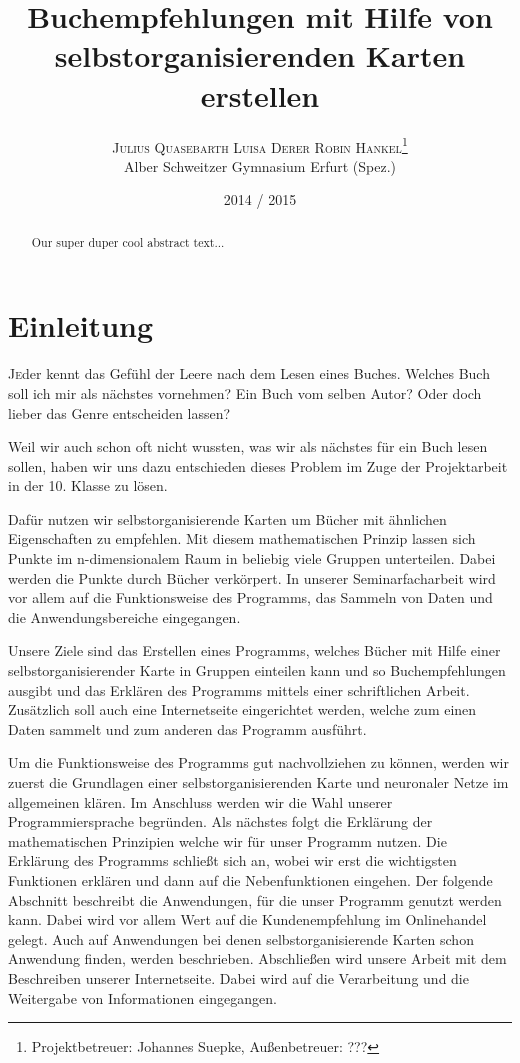 \documentclass[twoside,a4paper]{article}
\title{\vspace{-15mm}\fontsize{24pt}{10pt}\selectfont\bfseries{}Buchempfehlungen mit Hilfe von selbstorganisierenden Karten erstellen}
\author{\large\textsc{Julius Quasebarth \quad Luisa Derer \quad Robin Hankel}\thanks{Projektbetreuer: Johannes Suepke, Außenbetreuer: ???}\\[2mm]\normalsize Alber Schweitzer Gymnasium Erfurt (Spez.)\\\vspace{-5mm}}
\date{2014 / 2015}
\newcommand{\commonlettrine}[1]{\lettrine[nindent=0em,lines=2]{#1}}
\begin{document}
\maketitle

\thispagestyle{fancy}


\begin{otherlanguage}{english}
\begin{abstract}
\noindent
Our super duper cool abstract text...
\end{abstract}
\end{otherlanguage}

\tableofcontents

\section{Einleitung}

\commonlettrine{J}eder kennt das Gefühl der Leere nach dem Lesen eines Buches. Welches Buch soll ich mir als nächstes vornehmen? Ein Buch vom selben Autor? Oder doch lieber das Genre entscheiden lassen?

Weil wir auch schon oft nicht wussten, was wir als nächstes für ein Buch lesen sollen, haben wir uns dazu entschieden dieses Problem im Zuge der Projektarbeit in der 10. Klasse zu lösen.

Dafür nutzen wir selbstorganisierende Karten um Bücher mit ähnlichen Eigenschaften zu empfehlen. Mit diesem mathematischen Prinzip lassen sich Punkte im n-dimensionalem Raum in beliebig viele Gruppen unterteilen. Dabei werden die Punkte durch Bücher verkörpert. In unserer Seminarfacharbeit wird vor allem auf die Funktionsweise des Programms, das Sammeln von Daten und die Anwendungsbereiche eingegangen.

Unsere Ziele sind das Erstellen eines Programms, welches Bücher mit Hilfe einer selbstorganisierender Karte in Gruppen einteilen kann und so Buchempfehlungen ausgibt und das Erklären des Programms mittels einer schriftlichen Arbeit. Zusätzlich soll auch eine Internetseite eingerichtet werden, welche zum einen Daten sammelt und zum anderen das Programm ausführt.

Um die Funktionsweise des Programms gut nachvollziehen zu können, werden wir zuerst die Grundlagen einer selbstorganisierenden Karte und neuronaler Netze im allgemeinen klären. Im Anschluss werden wir die Wahl unserer Programmiersprache begründen. Als nächstes folgt die Erklärung der mathematischen Prinzipien welche wir für unser Programm nutzen. Die Erklärung des Programms schließt sich an, wobei wir erst die wichtigsten Funktionen erklären und dann auf die Nebenfunktionen eingehen. Der folgende Abschnitt beschreibt die Anwendungen, für die unser Programm genutzt werden kann. Dabei wird vor allem Wert auf die Kundenempfehlung im Onlinehandel gelegt. Auch auf Anwendungen bei denen selbstorganisierende Karten schon Anwendung finden, werden beschrieben. Abschließen wird unsere Arbeit mit dem Beschreiben unserer Internetseite. Dabei wird auf die Verarbeitung und die Weitergabe von Informationen eingegangen.
\end{document}

